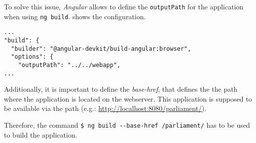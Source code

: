 To solve this issue, \textit{Angular} allows to define the \texttt{outputPath} for the application when using \texttt{ng build}.  shows the  configuration.
\begin{lstlisting}[label=lst:04_comments_building_config, caption=\texttt{angular.json} configuration]
...
"build": {
  "builder": "@angular-devkit/build-angular:browser",
  "options": {
    "outputPath": "../../webapp",
...
\end{lstlisting}


Additionally, it is important to define the \textit{base-href}, that defines the the path where the application is located on the webserver. This application is supposed to be available via the path  (e.g.: \url{http://localhost:8080/parliament/}).


Therefore, the command \texttt{\$ ng build -{}-base-href /parliament/} has to be used to build the application.
